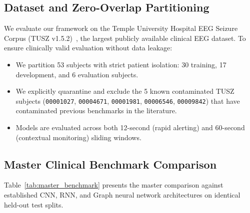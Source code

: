 \documentclass[journal]{IEEEtran}
\begin{document}
\subsection{Dataset and Zero-Overlap Partitioning}
We evaluate our framework on the Temple University Hospital EEG Seizure Corpus (TUSZ v1.5.2)~\cite{obeid2016temple}, the largest publicly available clinical EEG dataset. To ensure clinically valid evaluation without data leakage:
\begin{itemize}
    \item We partition 53 subjects with strict patient isolation: 30 training, 17 development, and 6 evaluation subjects.
    \item We explicitly quarantine and exclude the 5 known contaminated TUSZ subjects (\texttt{00001027}, \texttt{00004671}, \texttt{00001981}, \texttt{00006546}, \texttt{00009842}) that have contaminated previous benchmarks in the literature.
    \item Models are evaluated across both 12-second (rapid alerting) and 60-second (contextual monitoring) sliding windows.
\end{itemize}

\subsection{Master Clinical Benchmark Comparison}
Table~\ref{tab:master_benchmark} presents the master comparison against established CNN, RNN, and Graph neural network architectures on identical held-out test splits.
\end{document}

